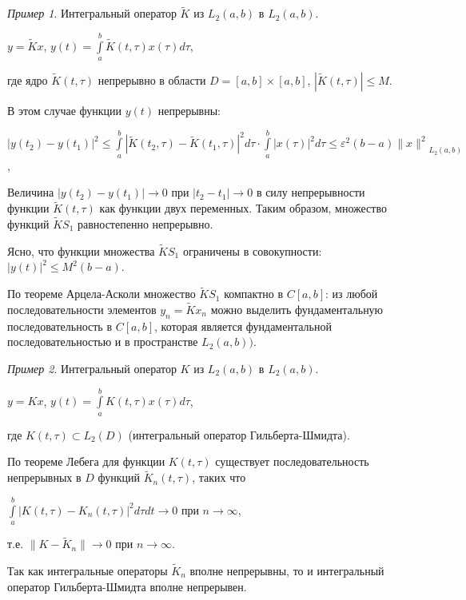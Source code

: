 \documentclass[12pt,a4paper,titlepage, oneside]{book}
\theoremstyle{definition}
\theoremstyle{plain}
\theoremstyle{remark}
\theoremstyle{remark}
\newtheorem*{example}{Пример}
\theoremstyle{remark}
\theoremstyle{remark}
\theoremstyle{plain}
\theoremstyle{plain}
\begin{document}
\begin{example}Интегральный оператор $\widetilde{K}$ из $L_2(a,b)$ в $L_2(a,b)$.

\begin{center}
$y=\widetilde{K}x$, $y(t)=\int\limits_a^b \widetilde{K}(t, \tau)x(\tau)d\tau$,
\end{center}

где ядро $\widetilde{K}(t, \tau)$ непрерывно в области $D=[a,b]\times[a,b]$, $|\widetilde{K}(t, \tau)|\leq M$.

В этом случае функции $y(t)$ непрерывны:

\begin{center}
$|y(t_2)-y(t_1)|^2\leq \int\limits_a^b |\widetilde{K}(t_2, \tau)-\widetilde{K}(t_1, \tau)|^2d\tau \cdot \int\limits_a^b |x(\tau)|^2 d\tau \leq \varepsilon^2 (b-a){\lVert x\rVert^2}_{L_2(a,b)}$,
\end{center}

Величина $|y(t_2)-y(t_1)|\to 0$ при $|t_2-t_1|\to 0$ в силу непрерывности функции $\widetilde{K}(t, \tau)$ как функции двух переменных. Таким образом, множество функций $\widetilde{K} S_1$ равностепенно непрерывно.

Ясно, что функции множества $\widetilde{K} S_1$ ограничены в совокупности: $|y(t)|^2 \leq M^2 (b-a)$.

По теореме Арцела-Асколи множество $\widetilde{K} S_1$ компактно в $C[a,b]$: из любой последовательности элементов $y_n=\widetilde{K} x_n$ можно выделить фундаментальную последовательность в $C[a,b]$, которая является фундаментальной последовательностью и в пространстве $L_2 (a,b))$.
\end{example}
\begin{example}Интегральный оператор $K$ из $L_2(a,b)$ в $L_2(a,b)$.
\begin{center}
$y=Kx$, $y(t)=\int\limits_a^b K(t, \tau)x(\tau)d\tau $,
\end{center}
где $K(t, \tau)\subset L_2(D)$ (интегральный оператор Гильберта-Шмидта).

По теореме Лебега для функции $K(t, \tau)$ существует последовательность непрерывных в $D$ функций $\widetilde{K}_n (t, \tau)$, таких что
\begin{center}
$\int\limits_a^b |K(t, \tau)-K_n(t, \tau)|^2d\tau dt \to 0$ при $n\to \infty$,
\end{center}
\begin{center}
т.е. $\lVert K-\widetilde{K}_n \rVert \to 0$ при $n\to \infty$.
\end{center}

Так как интегральные операторы $\widetilde{K}_n$ вполне непрерывны, то и интегральный оператор Гильберта-Шмидта вполне непрерывен.
\end{example}
\end{document}
